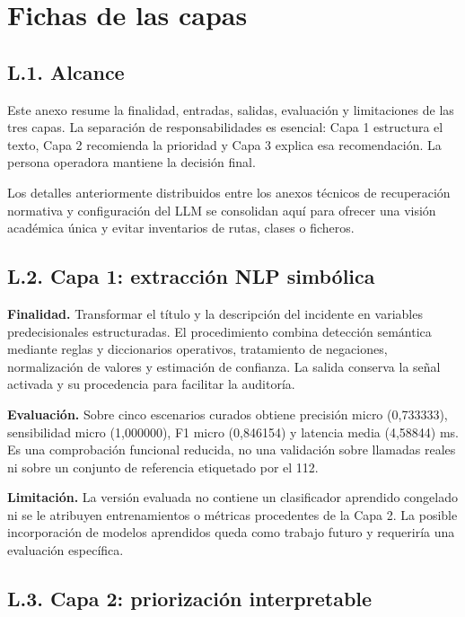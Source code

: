 \chapter{Fichas de las capas}
\label{cap:anexol}

\section*{L.1. Alcance}

Este anexo resume la finalidad, entradas, salidas, evaluación y limitaciones de las
tres capas. La separación de responsabilidades es esencial: Capa 1 estructura el texto,
Capa 2 recomienda la prioridad y Capa 3 explica esa recomendación. La persona operadora
mantiene la decisión final.

Los detalles anteriormente distribuidos entre los anexos técnicos de recuperación
normativa y configuración del LLM se consolidan aquí para ofrecer una visión académica
única y evitar inventarios de rutas, clases o ficheros.

\section*{L.2. Capa 1: extracción NLP simbólica}

\textbf{Finalidad.} Transformar el título y la descripción del incidente en variables
predecisionales estructuradas. El procedimiento combina detección semántica mediante
reglas y diccionarios operativos, tratamiento de negaciones, normalización de valores y
estimación de confianza. La salida conserva la señal activada y su procedencia para
facilitar la auditoría.

\textbf{Evaluación.} Sobre cinco escenarios curados obtiene precisión micro
(0{,}733333), sensibilidad micro (1{,}000000), F1 micro (0{,}846154) y latencia
media (4{,}58844) ms. Es una comprobación funcional reducida, no una validación sobre
llamadas reales ni sobre un conjunto de referencia etiquetado por el 112.

\textbf{Limitación.} La versión evaluada no contiene un clasificador aprendido
congelado ni se le atribuyen entrenamientos o métricas procedentes de la Capa 2. La
posible incorporación de modelos aprendidos queda como trabajo futuro y requeriría una
evaluación específica.

\section*{L.3. Capa 2: priorización interpretable}

